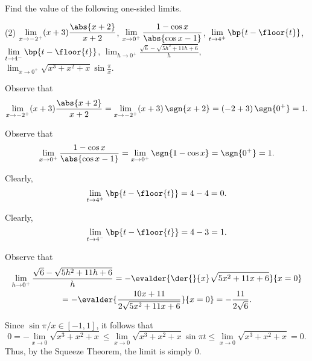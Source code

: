 \begin{problem}
    Find the value of the following one-sided limits.

    \begin{tasks}(2)
        \task $\displaystyle\lim_{x \to -2^+} (x+3) \frac{\abs{x+2}}{x+2}$,
        \task $\displaystyle\lim_{x \to 0^+} \frac{1 - \cos x}{\abs{\cos x - 1}}$,
        \task $\displaystyle\lim_{t \to 4^+} \bp{t - \floor{t}}$,
        \task $\displaystyle\lim_{t \to 4^-} \bp{t - \floor{t}}$,
        \task $\displaystyle\lim_{h \to 0^+} \frac{\sqrt6 - \sqrt{5h^2 + 11h + 6}}{h}$,
        \task $\displaystyle\lim_{x \to 0^+} \sqrt{x^3 + x^2 + x} \sin \frac\pi{x}$.
    \end{tasks}
\end{problem}
\begin{solution}
    \begin{ppart}
        Observe that \[\lim_{x \to -2^+} (x+3) \frac{\abs{x+2}}{x+2} = \lim_{x \to -2^+} (x+3) \, \sgn{x+2} = (-2 + 3) \, \sgn{0^+} = 1.\]
    \end{ppart}
    \begin{ppart}
        Observe that \[\lim_{x \to 0^+} \frac{1 - \cos x}{\abs{\cos x - 1}} = \lim_{x \to 0^+} \sgn{1 - \cos x} = \sgn{0^+} = 1.\]
    \end{ppart}
    \begin{ppart}
        Clearly, \[\lim_{t \to 4^+} \bp{t - \floor{t}} = 4 - 4 = 0.\]
    \end{ppart}
    \begin{ppart}
        Clearly, \[\lim_{t \to 4^-} \bp{t - \floor{t}} = 4 - 3 = 1.\]
    \end{ppart}
    \begin{ppart}
        Observe that
        \begin{gather*}
            \lim_{h \to 0^+} \frac{\sqrt6 - \sqrt{5h^2 + 11h + 6}}{h} = -\evalder{\der{}{x} \sqrt{5x^2 + 11x + 6}}{x = 0}\\
            = -\evalder{\frac{10x + 11}{2\sqrt{5x^2 + 11x + 6}}}{x = 0} = -\frac{11}{2\sqrt6}.
        \end{gather*}
    \end{ppart}
    \begin{ppart}
        Since $\sin{\pi/x} \in [-1, 1]$, it follows that \[0 = -\lim_{x \to 0} \sqrt{x^3 + x^2 + x} \leq \lim_{x \to 0} \sqrt{x^3 + x^2 + x} \sin \pi t \leq \lim_{x \to 0} \sqrt{x^3 + x^2 + x} = 0.\] Thus, by the Squeeze Theorem, the limit is simply 0.
    \end{ppart}
\end{solution}

